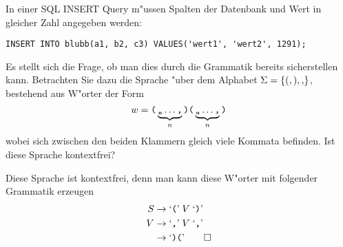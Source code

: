 In einer SQL INSERT Query m"ussen Spalten der Datenbank und Wert
in gleicher Zahl angegeben werden:
\begin{verbatim}
INSERT INTO blubb(a1, b2, c3) VALUES('wert1', 'wert2', 1291);
\end{verbatim}
Es stellt sich die Frage, ob man dies durch die Grammatik bereits
sicherstellen kann.
Betrachten Sie dazu die Sprache "uber dem Alphabet 
$\Sigma= \{ {\tt (}, {\tt )}, {\tt ,}\}$, bestehend aus W"orter der
Form
\[
w=
\text{\tt (}\underbrace{\text{\tt ,,}\dots\text{\tt ,}}_{n}
\text{\tt)(}\underbrace{\text{\tt,,}\dots\text{\tt ,}}_{n}\text{\tt )}
\]
wobei sich zwischen den beiden Klammern gleich viele Kommata befinden.
Ist diese Sprache kontextfrei?

\begin{loesung}
Diese Sprache ist kontextfrei, denn man kann diese W"orter mit folgender
Grammatik erzeugen
\begin{align*}
S&\rightarrow \text{`{\tt (}'}\; V \; \text{`{\tt )}'}\\
V&\rightarrow \text{`{\tt ,}'}\; V \; \text{`{\tt ,}'}\\
 &\rightarrow \text{`{\tt )(}'}
\qedhere
\end{align*}
\end{loesung}

